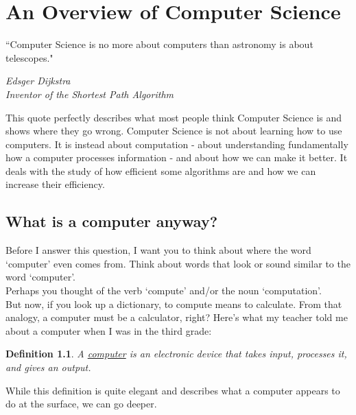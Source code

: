\documentclass[letterpaper, 12pt]{book}
\newtheorem{definition}{Definition}
\begin{document}
\chapter{An Overview of Computer Science}
\epigraph{\centering ``Computer Science is no more about computers than astronomy is about telescopes."}{\textit{Edsger Dijkstra \\ Inventor of the Shortest Path Algorithm}}
This quote perfectly describes what most people think Computer Science is and shows where they go wrong. Computer Science is not about learning how to use computers. It is instead about computation - about understanding fundamentally how a computer processes information - and  about how we can make it better. It deals with the study of how efficient some algorithms are and how we can increase their efficiency.
\section{What is a computer anyway?}
Before I answer this question, I want you to think about where the word `computer' even comes from. Think about words that look or sound similar to the word `computer'.\\
Perhaps you thought of the verb `compute' and/or the noun `computation'.\\
But now, if you look up a dictionary, to compute means to calculate. From that analogy, a computer must be a calculator, right?
Here's what my teacher told me about a computer when I was in the third grade:
\begin{definition}
A \underline{computer} is an electronic device that takes input, processes it, and gives an output.
\end{definition}
While this definition is quite elegant and describes what a computer appears to do at the surface, we can go deeper.
\end{document}
